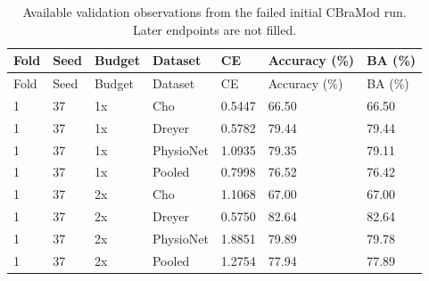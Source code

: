 \begin{longtable}{lllllll}
\caption{Available validation observations from the failed initial CBraMod run. Later endpoints are not filled.}\label{tab:budget_cb_failed_validation}\\
\toprule
Fold & Seed & Budget & Dataset & CE & Accuracy (\%) & BA (\%) \\
\midrule
\endfirsthead
\toprule
Fold & Seed & Budget & Dataset & CE & Accuracy (\%) & BA (\%) \\
\midrule
\endhead
1 & 37 & 1x & Cho & 0.5447 & 66.50 & 66.50 \\
1 & 37 & 1x & Dreyer & 0.5782 & 79.44 & 79.44 \\
1 & 37 & 1x & PhysioNet & 1.0935 & 79.35 & 79.11 \\
1 & 37 & 1x & Pooled & 0.7998 & 76.52 & 76.42 \\
1 & 37 & 2x & Cho & 1.1068 & 67.00 & 67.00 \\
1 & 37 & 2x & Dreyer & 0.5750 & 82.64 & 82.64 \\
1 & 37 & 2x & PhysioNet & 1.8851 & 79.89 & 79.78 \\
1 & 37 & 2x & Pooled & 1.2754 & 77.94 & 77.89 \\
\bottomrule
\end{longtable}
